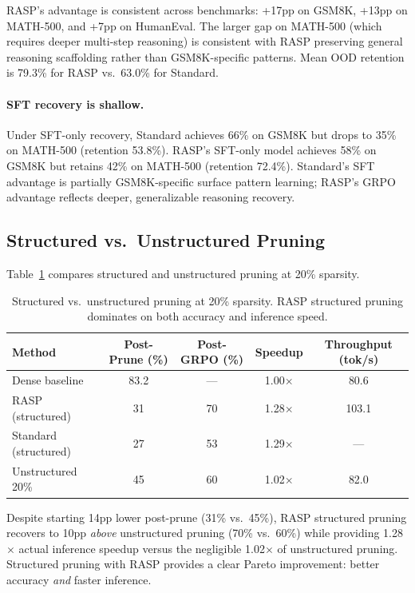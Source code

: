 \documentclass[11pt,a4paper]{article}
\newcommand{\method}{RASP}
\begin{document}
\method{}'s advantage is consistent across benchmarks: +17pp on GSM8K, +13pp on MATH-500, and +7pp on HumanEval. The larger gap on MATH-500 (which requires deeper multi-step reasoning) is consistent with \method{} preserving general reasoning scaffolding rather than GSM8K-specific patterns. Mean OOD retention is 79.3\% for \method{} vs.\ 63.0\% for Standard.

\paragraph{SFT recovery is shallow.} Under SFT-only recovery, Standard achieves 66\% on GSM8K but drops to 35\% on MATH-500 (retention 53.8\%). \method{}'s SFT-only model achieves 58\% on GSM8K but retains 42\% on MATH-500 (retention 72.4\%). Standard's SFT advantage is partially GSM8K-specific surface pattern learning; \method{}'s GRPO advantage reflects deeper, generalizable reasoning recovery.

\subsection{Structured vs.\ Unstructured Pruning}
\label{sec:unstructured}

Table~\ref{tab:unstructured} compares structured and unstructured pruning at 20\% sparsity.

\begin{table}[t]
\centering
\small
\caption{Structured vs.\ unstructured pruning at 20\% sparsity. \method{} structured pruning dominates on both accuracy and inference speed.}
\label{tab:unstructured}
\begin{tabular}{lcccc}
\toprule
\textbf{Method} & \textbf{Post-Prune (\%)} & \textbf{Post-GRPO (\%)} & \textbf{Speedup} & \textbf{Throughput (tok/s)} \\
\midrule
Dense baseline & 83.2 & --- & 1.00$\times$ & 80.6 \\
\method{} (structured) & 31 & 70 & 1.28$\times$ & 103.1 \\
Standard (structured) & 27 & 53 & 1.29$\times$ & --- \\
Unstructured 20\% & 45 & 60 & 1.02$\times$ & 82.0 \\
\bottomrule
\end{tabular}
\end{table}

Despite starting 14pp lower post-prune (31\% vs.\ 45\%), \method{} structured pruning recovers to 10pp \emph{above} unstructured pruning (70\% vs.\ 60\%) while providing 1.28$\times$ actual inference speedup versus the negligible 1.02$\times$ of unstructured pruning. Structured pruning with \method{} provides a clear Pareto improvement: better accuracy \emph{and} faster inference.
\end{document}
